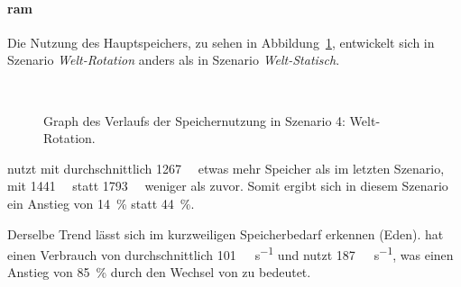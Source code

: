 \paragraph{\ac{ram}}
Die Nutzung des Hauptspeichers, zu sehen in Abbildung~\ref{fig:seed-0-rotate-mem}, entwickelt sich in Szenario \emph{Welt-Rotation} anders als in Szenario \emph{Welt-Statisch}.
\begin{figure}[!htbp]
	\\
	\caption{Graph des Verlaufs der Speichernutzung in Szenario 4: Welt-Rotation.}\label{fig:seed-0-rotate-mem}	
\end{figure} 
\sysA{} nutzt mit durchschnittlich \SI{1267}{\mega\byte} etwas mehr Speicher als im letzten Szenario, \sysB{} mit \SI{1441}{\mega\byte} statt \SI{1793}{\mega\byte} weniger als zuvor. Somit ergibt sich in diesem Szenario ein Anstieg von \SI{14}{\percent} statt \SI{44}{\percent}. 

Derselbe Trend lässt sich im kurzweiligen Speicherbedarf erkennen (Eden). \sysA{} hat einen Verbrauch von durchschnittlich \SI{101}{\mega\byte\per\second} und \sysB{} nutzt \SI{187}{\mega\byte\per\second}, was einen Anstieg von \SI{85}{\percent} durch den Wechsel von \sysA{} zu \sysB{} bedeutet.
